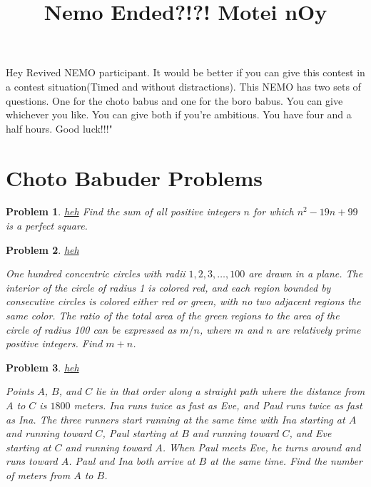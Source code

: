 \documentclass[12pt]{article}
\title{\vspace{-.1\textheight}Nemo Ended?!?! Motei nOy}
\newtheorem{problem}{Problem}
\begin{document}
	
	
	
	
	\maketitle
	
	
	\section*{}
	
		Hey Revived NEMO participant. It would be better if you can give this contest in a contest situation(Timed and without distractions). This NEMO has two sets of questions. One for the choto babus and one for the boro babus. You can give whichever you like. You can give both if you're ambitious. You have four and a half hours. Good luck!!!"
	
	
	
	
	\vspace{.1\textheight}
	
	
	\section{Choto Babuder Problems}
		
	
	\bigskip 
	
	\begin{problem}
		\href{https://artofproblemsolving.com/community/c321h125566p712040}{heh}
		Find the sum of all positive integers $n$ for which $n^2-19n+99$ is a perfect square.
	\end{problem}
	
	
	\bigskip
	
	
	\begin{problem}
		\href{https://artofproblemsolving.com/community/c4h87212p508856}{heh}
		
		One hundred concentric circles with radii $1, 2, 3, \dots, 100$ are drawn in a plane. The interior of the circle of radius 1 is colored red, and each region bounded by consecutive circles is colored either red or green, with no two adjacent regions the same color. The ratio of the total area of the green regions to the area of the circle of radius 100 can be expressed as $m/n$, where $m$ and $n$ are relatively prime positive integers. Find $m + n$.
	\end{problem}
	
	
	\bigskip
	
	
	\begin{problem}
		\href{https://artofproblemsolving.com/wiki/index.php/2018_AIME_II_Problems/Problem_1}{heh}
		
		Points $A$, $B$, and $C$ lie in that order along a straight path where the distance from $A$ to $C$ is $1800$ meters. Ina runs twice as fast as Eve, and Paul runs twice as fast as Ina. The three runners start running at the same time with Ina starting at $A$ and running toward $C$, Paul starting at $B$ and running toward $C$, and Eve starting at $C$ and running toward $A$. When Paul meets Eve, he turns around and runs toward $A$. Paul and Ina both arrive at $B$ at the same time. Find the number of meters from $A$ to $B$.
	\end{problem}
	
\end{document}
